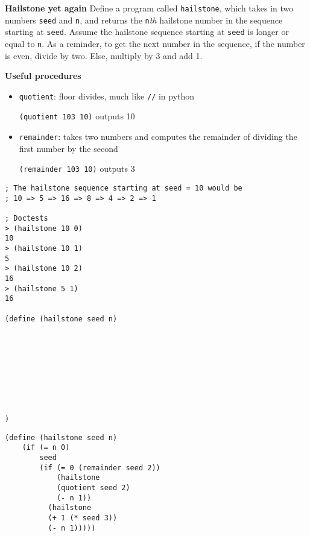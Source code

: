 \begin{blocksection}
\question \textbf{Hailstone yet again}
\newline
Define a program called \lstinline$hailstone$,
which takes in two numbers \lstinline$seed$ and \lstinline$n$, and returns the
\lstinline$n$\emph{th} hailstone number in the sequence starting at \lstinline$seed$.
Assume the hailstone sequence starting at \lstinline$seed$ is longer or equal to
\lstinline$n$. As a reminder, to get the next number in the sequence, if the number
is even, divide by two. Else, multiply by 3 and add 1.

\textbf{Useful procedures}

\begin{itemize}
\item \lstinline$quotient$: floor divides, much like \lstinline$//$ in python

\lstinline$(quotient 103 10)$ outputs 10

\item \lstinline$remainder$: takes two numbers and computes the remainder of dividing the first number by the second

\lstinline$(remainder 103 10)$ outputs 3
\end{itemize}

\vspace{\baselineskip}
\begin{lstlisting}
; The hailstone sequence starting at seed = 10 would be
; 10 => 5 => 16 => 8 => 4 => 2 => 1

; Doctests
> (hailstone 10 0)
10
> (hailstone 10 1)
5
> (hailstone 10 2)
16
> (hailstone 5 1)
16

(define (hailstone seed n)









)
\end{lstlisting}
\end{blocksection}
\begin{blocksection}
\begin{solution}[.1in]
\begin{lstlisting}
(define (hailstone seed n)
    (if (= n 0)
        seed
        (if (= 0 (remainder seed 2))
            (hailstone
            (quotient seed 2)
            (- n 1))
          (hailstone
          (+ 1 (* seed 3))
          (- n 1)))))
\end{lstlisting}
\end{solution}
\end{blocksection}
